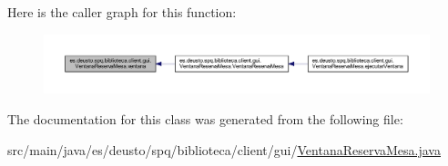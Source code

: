 Here is the caller graph for this function\+:
\nopagebreak
\begin{figure}[H]
\begin{center}
\leavevmode
\includegraphics[width=350pt]{classes_1_1deusto_1_1spq_1_1biblioteca_1_1client_1_1gui_1_1_ventana_reserva_mesa_a4b8df9a84d5e9378de27ca0e1aaaa690_icgraph}
\end{center}
\end{figure}


The documentation for this class was generated from the following file\+:\begin{DoxyCompactItemize}
\item 
src/main/java/es/deusto/spq/biblioteca/client/gui/\mbox{\hyperlink{_ventana_reserva_mesa_8java}{Ventana\+Reserva\+Mesa.\+java}}\end{DoxyCompactItemize}
